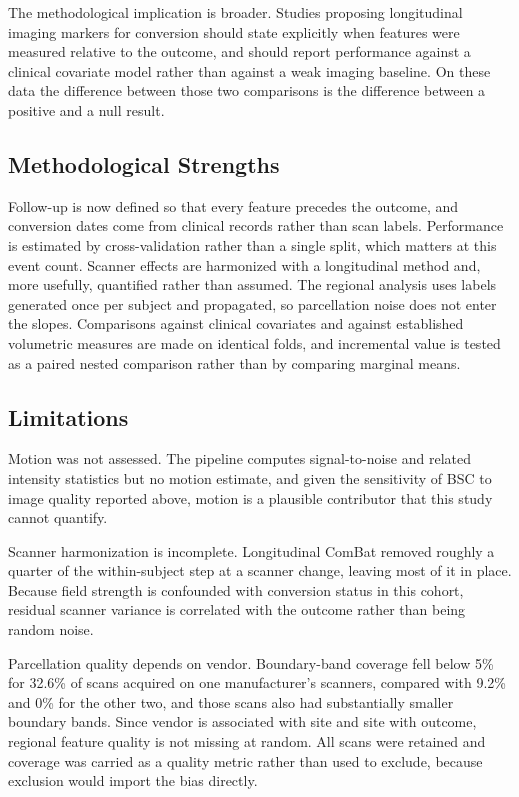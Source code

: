 \documentclass[blue]{ludusofficial}  %
\begin{document}
The methodological implication is broader. Studies proposing longitudinal imaging markers for conversion should state explicitly when features were measured relative to the outcome, and should report performance against a clinical covariate model rather than against a weak imaging baseline. On these data the difference between those two comparisons is the difference between a positive and a null result.

\subsection{Methodological Strengths}

Follow-up is now defined so that every feature precedes the outcome, and conversion dates come from clinical records rather than scan labels. Performance is estimated by cross-validation rather than a single split, which matters at this event count. Scanner effects are harmonized with a longitudinal method and, more usefully, quantified rather than assumed. The regional analysis uses labels generated once per subject and propagated, so parcellation noise does not enter the slopes. Comparisons against clinical covariates and against established volumetric measures are made on identical folds, and incremental value is tested as a paired nested comparison rather than by comparing marginal means.

\subsection{Limitations}

Motion was not assessed. The pipeline computes signal-to-noise and related intensity statistics but no motion estimate, and given the sensitivity of BSC to image quality reported above, motion is a plausible contributor that this study cannot quantify.

Scanner harmonization is incomplete. Longitudinal ComBat removed roughly a quarter of the within-subject step at a scanner change, leaving most of it in place. Because field strength is confounded with conversion status in this cohort, residual scanner variance is correlated with the outcome rather than being random noise.

Parcellation quality depends on vendor. Boundary-band coverage fell below 5\% for 32.6\% of scans acquired on one manufacturer's scanners, compared with 9.2\% and 0\% for the other two, and those scans also had substantially smaller boundary bands. Since vendor is associated with site and site with outcome, regional feature quality is not missing at random. All scans were retained and coverage was carried as a quality metric rather than used to exclude, because exclusion would import the bias directly.
\end{document}
